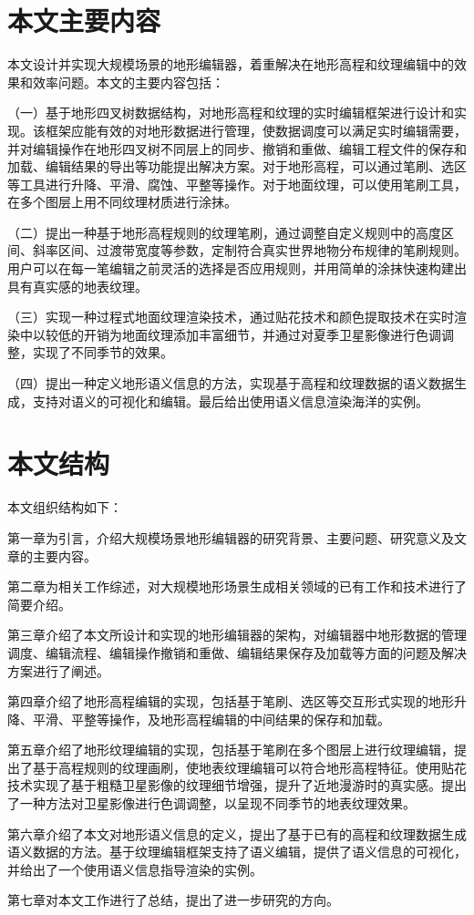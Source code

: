 \section{本文主要内容}
本文设计并实现大规模场景的地形编辑器，着重解决在地形高程和纹理编辑中的效果和效率问题。本文的主要内容包括：\par
（一）基于地形四叉树数据结构，对地形高程和纹理的实时编辑框架进行设计和实现。该框架应能有效的对地形数据进行管理，使数据调度可以满足实时编辑需要，并对编辑操作在地形四叉树不同层上的同步、撤销和重做、编辑工程文件的保存和加载、编辑结果的导出等功能提出解决方案。对于地形高程，可以通过笔刷、选区等工具进行升降、平滑、腐蚀、平整等操作。对于地面纹理，可以使用笔刷工具，在多个图层上用不同纹理材质进行涂抹。\par
（二）提出一种基于地形高程规则的纹理笔刷，通过调整自定义规则中的高度区间、斜率区间、过渡带宽度等参数，定制符合真实世界地物分布规律的笔刷规则。用户可以在每一笔编辑之前灵活的选择是否应用规则，并用简单的涂抹快速构建出具有真实感的地表纹理。\par
（三）实现一种过程式地面纹理渲染技术，通过贴花技术和颜色提取技术在实时渲染中以较低的开销为地面纹理添加丰富细节，并通过对夏季卫星影像进行色调调整，实现了不同季节的效果。\par
（四）提出一种定义地形语义信息的方法，实现基于高程和纹理数据的语义数据生成，支持对语义的可视化和编辑。最后给出使用语义信息渲染海洋的实例。\par
\section{本文结构}
本文组织结构如下：\par 
第一章为引言，介绍大规模场景地形编辑器的研究背景、主要问题、研究意义及文章的主要内容。\par 
第二章为相关工作综述，对大规模地形场景生成相关领域的已有工作和技术进行了简要介绍。\par 
第三章介绍了本文所设计和实现的地形编辑器的架构，对编辑器中地形数据的管理调度、编辑流程、编辑操作撤销和重做、编辑结果保存及加载等方面的问题及解决方案进行了阐述。\par
第四章介绍了地形高程编辑的实现，包括基于笔刷、选区等交互形式实现的地形升降、平滑、平整等操作，及地形高程编辑的中间结果的保存和加载。\par
第五章介绍了地形纹理编辑的实现，包括基于笔刷在多个图层上进行纹理编辑，提出了基于高程规则的纹理画刷，使地表纹理编辑可以符合地形高程特征。使用贴花技术实现了基于粗糙卫星影像的纹理细节增强，提升了近地漫游时的真实感。提出了一种方法对卫星影像进行色调调整，以呈现不同季节的地表纹理效果。\par
第六章介绍了本文对地形语义信息的定义，提出了基于已有的高程和纹理数据生成语义数据的方法。基于纹理编辑框架支持了语义编辑，提供了语义信息的可视化，并给出了一个使用语义信息指导渲染的实例。\par
第七章对本文工作进行了总结，提出了进一步研究的方向。


